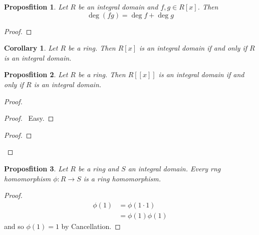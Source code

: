 \documentclass{book}
\let\qed\relax
\newtheorem{prop}{Proposfition}[chapter]
\newtheorem{cor}{Corollary}[prop]
\theoremstyle{definition}
\begin{document}
\begin{prop}
Let $R$ be an integral domain and $f,g \in R[x]$. Then
\[ \deg(fg) = \deg f + \deg g \]
\end{prop}

\begin{proof}
\pf
{}
\qed
\end{proof}

\begin{cor}
Let $R$ be a ring. Then $R[x]$ is an integral domain if and only if $R$ is an integral domain.
\end{cor}

\begin{prop}
Let $R$ be a ring. Then $R[[x]]$ is an integral domain if and only if $R$ is an integral domain.
\end{prop}

\begin{proof}
\pf
{}
\begin{proof}
	\pf\ Easy.
\end{proof}
\begin{proof}
\end{proof}
\qed
\end{proof}

\begin{prop}
Let $R$ be a ring and $S$ an integral domain. Every rng homomorphism $\phi : R \rightarrow S$ is a ring homomorphism.
\end{prop}

\begin{proof}
\pf
\begin{align*}
\phi(1) & = \phi(1 \cdot 1) \\
& = \phi(1) \phi(1)
\end{align*}
and so $\phi(1) = 1$ by Cancellation. \qed
\end{proof}
\end{document}
